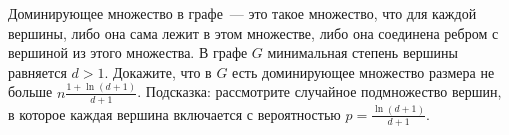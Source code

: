 Доминирующее множество в графе~--- это такое множество, что для каждой вершины, либо она сама лежит в этом множестве, либо
она соединена ребром с вершиной из этого множества. В графе $G$ минимальная степень вершины равняется $d > 1$. Докажите, что
в $G$ есть доминирующее множество  размера не больше $n \frac{1 + \ln(d + 1)}{d + 1}$. Подсказка: рассмотрите случайное
подмножество вершин, в которое каждая вершина включается с вероятностью $p = \frac{\ln(d + 1)}{d + 1}$.